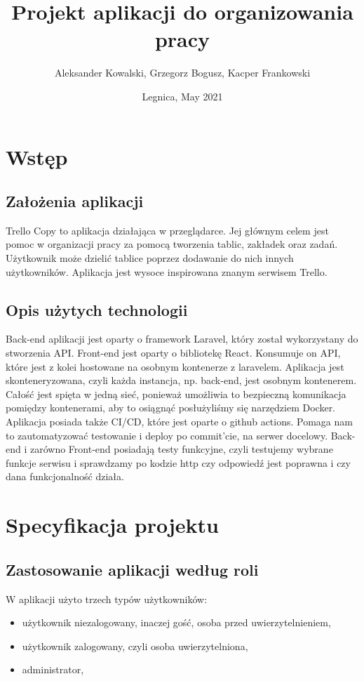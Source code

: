 \documentclass[12pt, letterpaper]{article}
\title{\textbf{Projekt aplikacji do organizowania pracy}}
\author{Aleksander Kowalski, Grzegorz Bogusz, Kacper Frankowski}
\date{Legnica, May 2021}
\begin{document}
\maketitle
\pagebreak
\newpage
\renewcommand*\contentsname{Spis treści}
\tableofcontents
\pagebreak
\newpage
\section{Wstęp}
\subsection{Założenia aplikacji}
\thispagestyle{empty}
\item{Trello Copy to aplikacja działająca w przeglądarce. Jej głównym celem jest pomoc w organizacji pracy za pomocą tworzenia tablic, zakładek oraz zadań. Użytkownik może dzielić tablice poprzez dodawanie do nich innych użytkowników. Aplikacja jest wysoce inspirowana znanym serwisem Trello.}
\subsection{Opis użytych technologii}
\thispagestyle{empty}
\item{Back-end aplikacji jest oparty o framework Laravel, który został wykorzystany do stworzenia API. Front-end jest oparty o bibliotekę React. Konsumuje on API, które jest z kolei hostowane na osobnym kontenerze z laravelem. Aplikacja jest skonteneryzowana, czyli każda instancja, np. back-end, jest osobnym kontenerem. Całość jest spięta w jedną sieć, ponieważ umożliwia to bezpieczną komunikacja pomiędzy kontenerami, aby to osiągnąć posłużyliśmy się narzędziem Docker. Aplikacja posiada także CI/CD, które jest oparte o github actions. Pomaga nam to zautomatyzować testowanie i deploy po commit'cie, na serwer docelowy. Back-end i zarówno Front-end posiadają testy funkcyjne, czyli testujemy wybrane funkcje serwisu i sprawdzamy po kodzie http czy odpowiedź jest poprawna i czy dana funkcjonalność działa.}
\pagebreak
\newpage
\section{\textbf{Specyfikacja projektu}}
\subsection{Zastosowanie aplikacji według roli}
\item{W aplikacji użyto  trzech typów użytkowników:}
\begin{itemize}
    \item {użytkownik niezalogowany, inaczej gość, osoba przed uwierzytelnieniem,}
    \item {użytkownik zalogowany, czyli osoba uwierzytelniona,}
    \item {administrator,}
\end{itemize}
\end{document}
